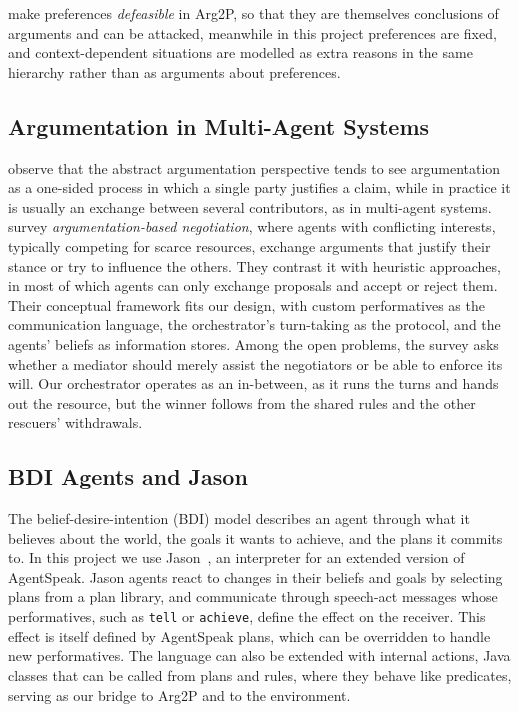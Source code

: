 \citet{pisano2021preferences} make preferences \emph{defeasible} in Arg2P, so that they are themselves conclusions of arguments and can be attacked, meanwhile in this project preferences are fixed, and context-dependent situations are modelled as extra reasons in the same hierarchy rather than as arguments about preferences.

\subsection{Argumentation in Multi-Agent Systems}

\citet{calegari2022arg2p} observe that the abstract argumentation perspective tends to see argumentation as a one-sided process in which a single party justifies a claim, while in practice it is usually an exchange between several contributors, as in multi-agent systems.
\citet{rahwan2003} survey \emph{argumentation-based negotiation}, where agents with conflicting interests, typically competing for scarce resources, exchange arguments that justify their stance or try to influence the others.
They contrast it with heuristic approaches, in most of which agents can only exchange proposals and accept or reject them.
Their conceptual framework fits our design, with custom performatives as the communication language, the orchestrator's turn-taking as the protocol, and the agents' beliefs as information stores.
Among the open problems, the survey asks whether a mediator should merely assist the negotiators or be able to enforce its will.
Our orchestrator operates as an in-between, as it runs the turns and hands out the resource, but the winner follows from the shared rules and the other rescuers' withdrawals.

\subsection{BDI Agents and Jason}

The belief-desire-intention (BDI) model describes an agent through what it believes about the world, the goals it wants to achieve, and the plans it commits to.
In this project we use Jason~\citet{bordini2007}, an interpreter for an extended version of AgentSpeak.
Jason agents react to changes in their beliefs and goals by selecting plans from a plan library, and communicate through speech-act messages whose performatives, such as \texttt{tell} or \texttt{achieve}, define the effect on the receiver.
This effect is itself defined by AgentSpeak plans, which can be overridden to handle new performatives.
The language can also be extended with internal actions, Java classes that can be called from plans and rules, where they behave like predicates, serving as our bridge to Arg2P and to the environment.
